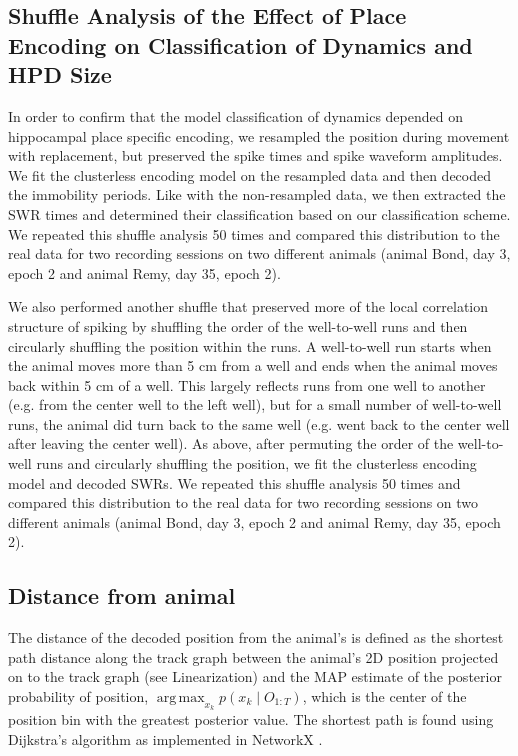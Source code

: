 \documentclass[9pt,lineno]{elife}
\DeclareMathOperator*{\argmax}{arg\,max}
\begin{document}
\subsection*{Shuffle Analysis of the Effect of Place Encoding on Classification of Dynamics and HPD Size}
In order to confirm that the model classification of dynamics depended on hippocampal place specific encoding, we resampled the position during movement with replacement, but preserved the spike times and spike waveform amplitudes. We fit the clusterless encoding model on the resampled data and then decoded the immobility periods. Like with the non-resampled data, we then extracted the SWR times and determined their classification based on our classification scheme. We repeated this shuffle analysis 50 times and compared this distribution to the real data for two recording sessions on two different animals (animal Bond, day 3, epoch 2 and animal Remy, day 35, epoch 2).

We also performed another shuffle that preserved more of the local correlation structure of spiking by shuffling the order of the well-to-well runs and then circularly shuffling the position within the runs. A well-to-well run starts when the animal moves more than 5 cm from a well and ends when the animal moves back within 5 cm of a well. This largely reflects runs from one well to another (e.g. from the center well to the left well), but for a small number of well-to-well runs, the animal did turn back to the same well (e.g. went back to the center well after leaving the center well). As above, after permuting the order of the well-to-well runs and circularly shuffling the position, we fit the clusterless encoding model and decoded SWRs. We repeated this shuffle analysis 50 times and compared this distribution to the real data for two recording sessions on two different animals (animal Bond, day 3, epoch 2 and animal Remy, day 35, epoch 2).

\subsection*{Distance from animal}
The distance of the decoded position from the animal's is defined as the shortest path distance along the track graph between the animal's 2D position projected on to the track graph (see Linearization) and the MAP estimate of the posterior probability of position, $\argmax_{x_k} p(x_{k} \mid O_{1:T})$, which is the center of the position bin with the greatest posterior value. The shortest path is found using Dijkstra's algorithm \citep{Dijkstranotetwoproblems1959} as implemented in NetworkX \citep{HagbergExploringNetworkStructure2008}.
\end{document}
